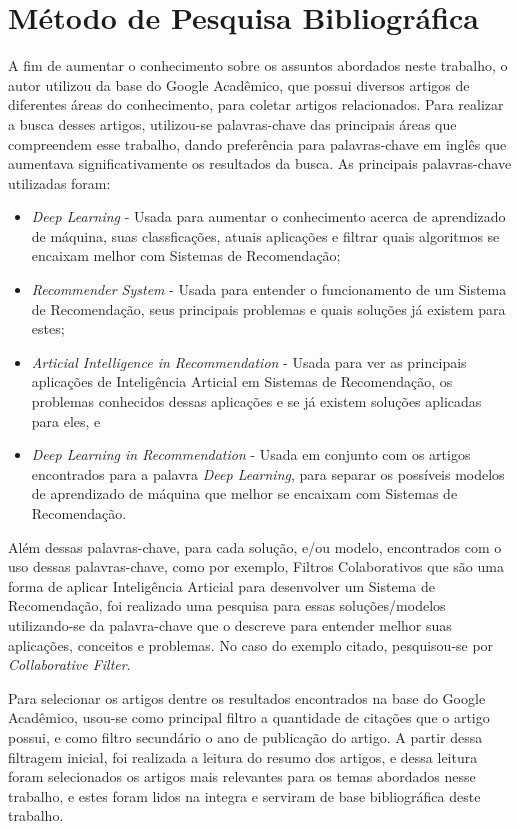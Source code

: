 \section{Método de Pesquisa Bibliográfica}\label{sec:metpesq}

A fim de aumentar o conhecimento sobre os assuntos abordados neste trabalho, o autor utilizou da base do Google Acadêmico,
que possui diversos artigos de diferentes áreas do conhecimento, para coletar artigos relacionados. Para realizar a busca 
desses artigos, utilizou-se palavras-chave das principais áreas que compreendem esse trabalho, dando preferência para 
palavras-chave em inglês que aumentava significativamente os resultados da busca.
As principais palavras-chave utilizadas foram:

\begin{itemize}
    \item \textit{Deep Learning} - Usada para aumentar o conhecimento acerca de aprendizado de máquina, suas classficações,
    atuais aplicações e filtrar quais algoritmos se encaixam melhor com Sistemas de Recomendação;
    \item \textit{Recommender System} - Usada para entender o funcionamento de um Sistema de Recomendação, seus principais
    problemas e quais soluções já existem para estes;
    \item \textit{Articial Intelligence in Recommendation} - Usada para ver as principais aplicações de Inteligência Articial
    em Sistemas de Recomendação, os problemas conhecidos dessas aplicações e se já existem soluções aplicadas para eles, e
    \item \textit{Deep Learning in Recommendation} - Usada em conjunto com os artigos encontrados para a palavra 
    \textit{Deep Learning}, para separar os possíveis modelos de aprendizado de máquina que melhor se encaixam com Sistemas
    de Recomendação.
\end{itemize}

Além dessas palavras-chave, para cada solução, e/ou modelo, encontrados com o uso dessas palavras-chave, como por exemplo, 
Filtros Colaborativos que são uma forma de aplicar Inteligência Articial para desenvolver um Sistema de Recomendação, foi
realizado uma pesquisa para essas soluções/modelos utilizando-se da palavra-chave que o descreve para entender melhor suas
aplicações, conceitos e problemas. No caso do exemplo citado, pesquisou-se por \textit{Collaborative Filter}. 

Para selecionar os artigos dentre os resultados encontrados na base do Google Acadêmico, usou-se como principal filtro a 
quantidade de citações que o artigo possui, e como filtro secundário o ano de publicação do artigo. A partir dessa filtragem
inicial, foi realizada a leitura do resumo dos artigos, e dessa leitura foram selecionados os artigos mais relevantes para os 
temas abordados nesse trabalho, e estes foram lidos na integra e serviram de base bibliográfica deste trabalho.

